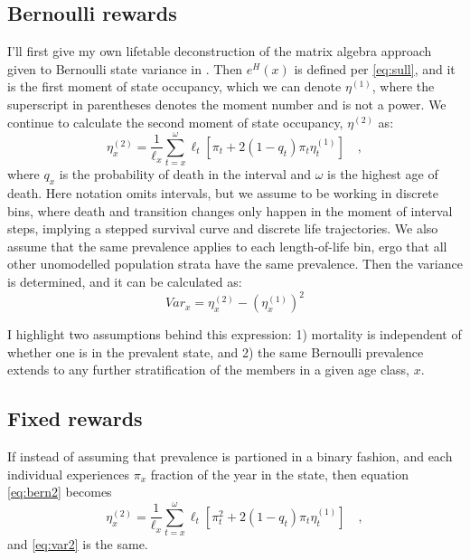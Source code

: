 \documentclass{bmcart}
\begin{document}
\subsection*{Bernoulli rewards}
I'll first give my own lifetable deconstruction of the matrix algebra approach given to Bernoulli state variance in \cite{caswell2018matrix}. Then $e^H(x)$ is defined per \eqref{eq:sull}, and it is the first moment of state occupancy, which we can denote $\eta^{(1)}$, where the superscript in parentheses denotes the moment number and is not a power. We continue to calculate the second moment of state occupancy, $\eta^{(2)}$ as:
\begin{equation}
\label{eq:bern2}
\eta^{(2)}_x = \frac{1}{\ell_x} \sum_{t=x}^\omega \ell_t\left[\pi_t + 2(1-q_t)\pi_t\eta^{(1)}_t\right] \quad \mathrm{,}
\end{equation}
where $q_x$ is the probability of death in the interval and $\omega$ is the highest age of death. Here notation omits intervals, but we assume to be working in discrete bins, where death and transition changes only happen in the moment of interval steps, implying a stepped survival curve and discrete life trajectories. We also assume that the same prevalence applies to each length-of-life bin, ergo that all other unomodelled population strata have the same prevalence. Then the variance is determined, and it can be calculated as:
\begin{equation}
\label{eq:var2}
Var_x = \eta^{(2)}_x - (\eta^{(1)}_x)^2
\end{equation}

I highlight two assumptions behind this expression: 1) mortality is independent of whether one is in the prevalent state, and 2) the same Bernoulli prevalence extends to any further stratification of the members in a given age class, $x$.

\subsection*{Fixed rewards}
If instead of assuming that prevalence is partioned in a binary fashion, and each individual experiences $\pi_x$ fraction of the year in the state, then equation \eqref{eq:bern2} becomes
\begin{equation}
\eta^{(2)}_x = \frac{1}{\ell_x} \sum_{t=x}^\omega \ell_t\left[\pi_t^2 + 2(1-q_t)\pi_t\eta^{(1)}_t\right] \quad \mathrm{,}
\end{equation}
and \eqref{eq:var2} is the same.
\end{document}
